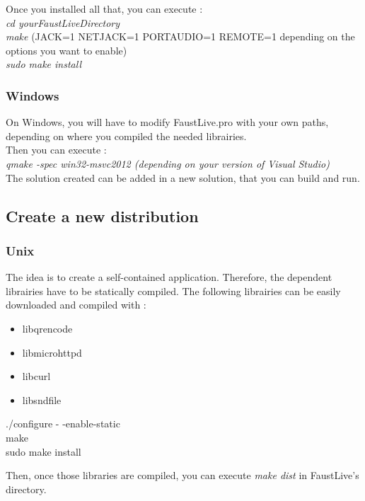 \documentclass[a4paper]{article}
\begin{document}
{Once you installed all that, you can execute : \\
{\it cd yourFaustLiveDirectory} \\
{\it make} (JACK=1 NETJACK=1 PORTAUDIO=1 REMOTE=1 depending on the options you want to enable)\\
{\it sudo make install} 

\subsubsection{Windows}

On Windows, you will have to modify FaustLive.pro with your own paths, depending on where you compiled the needed librairies. \\

Then you can execute : \\
{\it qmake -spec win32-msvc2012 (depending on your version of Visual Studio)} \\
The solution created can be added in a new solution, that you can build and run. 

\subsection{Create a new distribution}

\subsubsection{Unix}

The idea is to create a self-contained application. Therefore, the dependent librairies have to be statically compiled. The following librairies can be easily downloaded and compiled with : 

\begin{multicols}{2}

\begin{itemize}
\item libqrencode
\item libmicrohttpd
\item libcurl
\item libsndfile
\end{itemize}


./configure - -enable-static \\
make \\
sudo make install \\
\end{multicols}

Then, once those libraries are compiled, you can execute {\it make dist} in FaustLive's directory.

}
\end{document}
